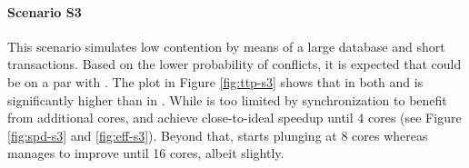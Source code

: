 \paragraph{Scenario S3}

This scenario simulates low contention by means of a large database and short
transactions. Based on the lower probability of conflicts, it is expected that
\midas could be on a par with \echo. The plot in Figure \ref{fig:ttp-s3} shows
that \ttp in both \midas and \midasopt is significantly higher than in \echo.
While \midas is too limited by synchronization to benefit from additional cores,
\echo and \midasopt achieve close-to-ideal speedup until 4 cores (see Figure
\ref{fig:spd-s3} and \ref{fig:eff-s3}). Beyond that, \echo starts plunging at 8
cores whereas \midasopt manages to improve until 16 cores, albeit slightly.

